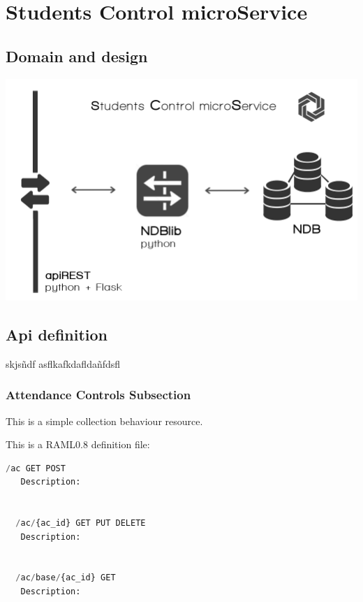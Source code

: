 \section{Students Control microService}

\subsection{Domain and design}

\begin{center}
\includegraphics[scale=0.4]{img/graphics/scms.png}
\end{center}

\subsection{Api definition}

skjsñdf
asflkafkdafldañfdsfl


\subsubsection{Attendance Controls Subsection}

This is a simple collection behaviour resource.

This is a RAML0.8 definition file:

\begin{lstlisting}[language=python,frame=none]
  /ac GET POST
   Description:


  /ac/{ac_id} GET PUT DELETE
   Description:


  /ac/base/{ac_id} GET
   Description:
\end{lstlisting}







